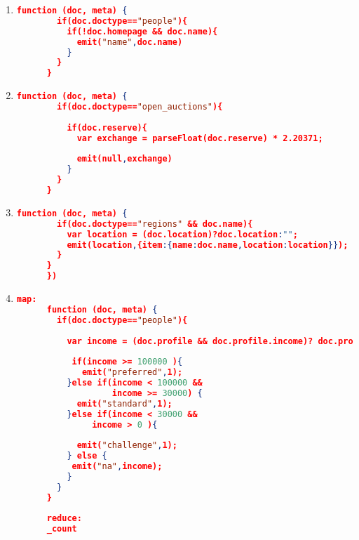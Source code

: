 \begin{enumerate}[label=Q\arabic*.]
    
    \item %
	\begin{lstlisting}[language=JSON, basicstyle=\scriptsize]
	  function (doc, meta) {
	    if(doc.doctype=="people"){
	      if(!doc.homepage && doc.name){
	        emit("name",doc.name)
	      } 
	    }
	  }
	\end{lstlisting}	

    \item %
	\begin{lstlisting}[language=JSON, basicstyle=\scriptsize]
	  function (doc, meta) {
	    if(doc.doctype=="open_auctions"){
	      
	      if(doc.reserve){
	      	var exchange = parseFloat(doc.reserve) * 2.20371;
	        
	        emit(null,exchange)
	      } 
	    }
	  }
	\end{lstlisting}	

    \item %
	\begin{lstlisting}[language=JSON, basicstyle=\scriptsize]
	  function (doc, meta) {
	    if(doc.doctype=="regions" && doc.name){
	      var location = (doc.location)?doc.location:"";
	      emit(location,{item:{name:doc.name,location:location}});
	    }
	  }
	  })
	\end{lstlisting}	
    \item %
	\begin{lstlisting}[language=JSON, basicstyle=\scriptsize]
	  map:
	  function (doc, meta) {
	    if(doc.doctype=="people"){
	   
	      var income = (doc.profile && doc.profile.income)? doc.profile.income : 0;
	  
	       if(income >= 100000 ){
	    	 emit("preferred",1);
	      }else if(income < 100000 && 
	               income >= 30000) {
	        emit("standard",1);
	      }else if(income < 30000 &&
	           income > 0 ){
	       
	        emit("challenge",1);
	      } else {
	       emit("na",income);
	      }
	    }
	  }
	  
	  reduce:
	  _count
	\end{lstlisting}

\end{enumerate}
